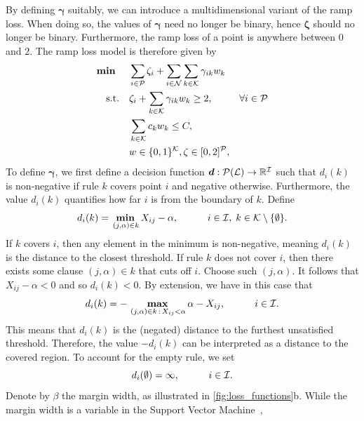 By defining $\bm{\gamma}$ suitably, we can introduce a multidimensional variant of the ramp loss.
When doing so, the values of $\bm{\gamma}$ need no longer be binary, hence $\bm{\zeta}$ should no longer be binary.
Furthermore, the ramp loss of a point is anywhere between $0$ and $2$.
The ramp loss model is therefore given by
\begin{subequations}
    \label{eq:RM}
    \begin{align}
        \mathbf{\text{\textbf{min }}} \quad & \sum_{i \in \mathcal{P}} \zeta_i + \sum_{i \in \mathcal{N}} \sum_{k \in \mathcal{K}} \gamma_{ik} w_k \label{eq:RM-obj} \\
        \mathbf{\text{s.t.}} \quad & \zeta_i + \sum_{k \in \mathcal{K}} \gamma_{ik} w_k \geq 2, & \forall i \in \mathcal{P} \label{eq:RM-misP} \\
        & \sum_{k \in \mathcal{K}} c_k w_k \leq C, & \label{eq:RM-complex} \\
        & w \in \{0, 1\}^{\mathcal{K}}, \zeta \in [0,2]^{\mathcal{P}}, \label{eq:RM-vars}
    \end{align}
\end{subequations}
To define $\bm{\gamma}$, we first define a decision function $\bm{d}: \mathcal{P}(\mathcal{L}) \to \mathbb{R}^{\mathcal{I}}$ such that $d_i(k)$ is
non-negative if rule $k$ covers point $i$ and negative otherwise.
Furthermore, the value $d_i(k)$ quantifies how far $i$ is from the boundary of $k$.
Define
\begin{equation}\label{eq:decision_function}
    d_i(k) = \mathop{\text{\textbf{min}}}\limits_{\,(j,\alpha) \in k} X_{ij} - \alpha, \quad \quad \quad i \in \mathcal{I}, \; k \in \mathcal{K}\setminus\{\emptyset\}.
\end{equation}
If $k$ covers $i$, then any element in the minimum is non-negative, meaning $d_i(k)$ is the distance to the closest threshold.
If rule $k$ does not cover $i$, then there exists some clause $(j,\alpha) \in k$ that cuts off $i$.
Choose such $(j,\alpha)$.
It follows that $X_{ij} - \alpha < 0$ and so $d_i(k) < 0$.
By extension, we have in this case that
\[
    d_i(k) = -\mathop{\text{\textbf{max}}}\limits_{\,(j,\alpha) \in k \,:\, X_{ij} < \alpha} \alpha - X_{ij}, \quad \quad \quad i \in \mathcal{I}.
\]
This means that $d_i(k)$ is the (negated) distance to the furthest unsatisfied threshold.
Therefore, the value $-d_i(k)$ can be interpreted as a distance to the covered region.
To account for the empty rule, we set
\begin{equation}
    d_i(\emptyset) = \infty, \quad \quad \quad i \in \mathcal{I}. \label{eq:decision_function_empty_rule}
\end{equation}
Denote by $\beta$ the margin width, as illustrated in \autoref{fig:loss_functions}b.
While the margin width is a variable in the Support Vector Machine~\cite{belotti_spatial_2024},

